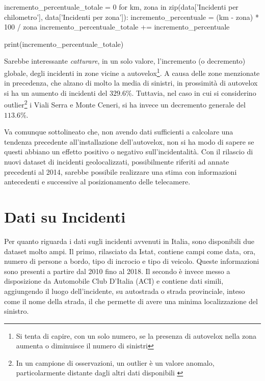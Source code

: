 \documentclass[a4paper,12pt]{report}
\newcommand{\quotestyle}[1]{\textit{#1}}
\begin{document}
\begin{code}
incremento_percentuale_totale = 0
for km, zona in zip(data['Incidenti per chilometro'], data['Incidenti per zona']): 
    incremento_percentuale = (km - zona) * 100 / zona
    incremento_percentuale_totale += incremento_percentuale

print(incremento_percentuale_totale)
\end{code}

Sarebbe interessante \quotestyle{catturare}, in un solo valore, l'incremento (o decremento) 
globale, degli incidenti in zone vicine a 
autovelox\footnote{Si tenta di capire, con un solo numero, se la presenza di 
autovelox nella zona aumenta o diminuisce il numero di sinistri}.
A causa delle zone menzionate in precedenza, che alzano di molto la media di sinistri, 
in prossimità di autovelox si ha un aumento di 
incidenti del $329.6$\%. 
Tuttavia, nel caso in cui si considerino 
outlier\footnote{In un campione di osservazioni, un outlier è un valore anomalo, 
particolarmente distante dagli altri dati disponibili \cite{PROB_E_STATISTICA:1}} 
i Viali Serra e Monte Ceneri, si ha invece un decremento generale del $113.6$\%.

Va comunque sottolineato che, non avendo dati sufficienti a calcolare una tendenza 
precedente all'installazione dell'autovelox, non si ha modo di sapere se questi abbiano un 
effetto positivo o negativo sull'incidentalità.
Con il rilascio di nuovi dataset di incidenti geolocalizzati, possibilmente riferiti ad annate 
precedenti al 2014, sarebbe possibile realizzare una stima con informazioni antecedenti e 
successive al posizionamento delle telecamere.

\chapter{Dati su Incidenti}

Per quanto riguarda i dati sugli incidenti avvenuti in Italia, 
sono disponibili due dataset molto ampi. 
Il primo, rilasciato da Istat, contiene campi come data, ora, 
numero di persone a bordo, tipo di incrocio e tipo di veicolo.
Queste informazioni sono presenti a partire dal 2010 fino al 2018.
Il secondo è invece messo a disposizione da Automobile Club D'Italia (ACI) 
e contiene dati simili, 
aggiungendo il luogo dell'incidente, su autostrada o strada provinciale, 
inteso come il nome della strada, il che permette di avere una minima localizzazione del 
sinistro.
\end{document}
